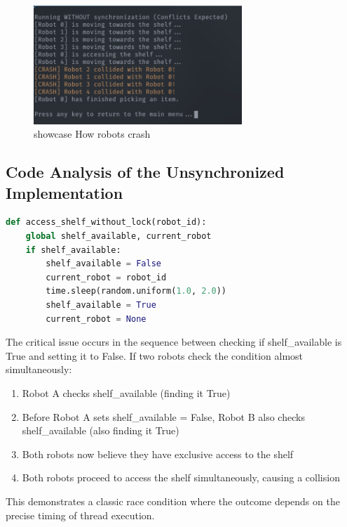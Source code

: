 \documentclass{article}
\begin{document}
\begin{figure}[H]
	\centering
	\includegraphics[width=0.7\textwidth]{./images/crash.png}
	\caption{showcase How robots crash}
	\label{fig:showcase-How-robots-crash}
\end{figure}

\subsection{Code Analysis of the Unsynchronized Implementation}

\begin{file}[Main.py]
	\begin{lstlisting}[language=Python]
def access_shelf_without_lock(robot_id):
    global shelf_available, current_robot
    if shelf_available:
        shelf_available = False
        current_robot = robot_id
        time.sleep(random.uniform(1.0, 2.0))
        shelf_available = True
        current_robot = None
\end{lstlisting}
\end{file}

The critical issue occurs in the sequence between checking if shelf\_available is True and setting it to False. If two robots check the condition almost simultaneously:

\begin{enumerate}
	\item Robot A checks shelf\_available (finding it True)
	\item Before Robot A sets shelf\_available = False, Robot B also checks shelf\_available (also finding it True)
	\item Both robots now believe they have exclusive access to the shelf
	\item Both robots proceed to access the shelf simultaneously, causing a collision
\end{enumerate}

This demonstrates a classic race condition where the outcome depends on the precise timing of thread execution.
\end{document}
